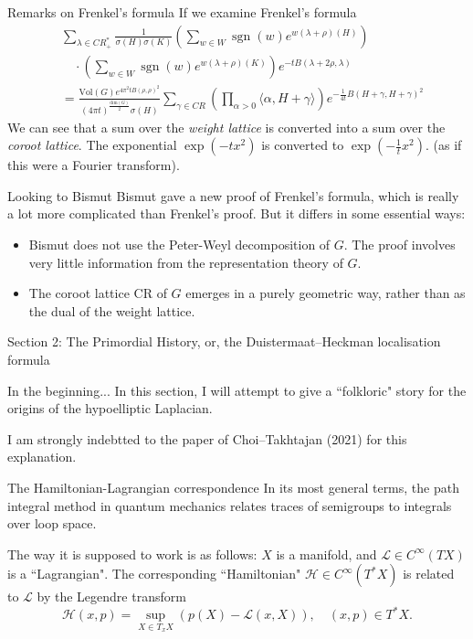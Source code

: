 \documentclass{beamer}
\numberwithin{equation}{section}
\theoremstyle{plain}
\theoremstyle{plain}
\theoremstyle{definition}
\theoremstyle{plain}
\theoremstyle{plain}
\theoremstyle{definition}
\newcommand{\Hc}{\mathcal{H}}
\newcommand{\Lc}{\mathcal{L}}
\newcommand{\sgn}{\operatorname{sgn}}
\newcommand{\CR}{\mathrm{CR}}
\begin{document}
\begin{frame}{Remarks on Frenkel's formula}
If we examine Frenkel's formula
\begin{align*}
 &\sum_{\lambda \in CR^*_+} \frac{1}{\sigma(H)\sigma(K)}\left(\sum_{w \in W} \sgn(w)e^{w(\lambda+\rho)(H)}\right)\\
      &\quad \cdot \left(\sum_{w\in W} \sgn(w)e^{w(\lambda+\rho)(K)}\right)e^{-tB(\lambda+2\rho,\lambda)}\\
      &=\frac{\mathrm{Vol}(G)e^{4\pi^2tB(\rho,\rho)^2}}{(4\pi t)^{\frac{\mathrm{dim}(G)}{2}}\sigma(H)}\sum_{\gamma \in CR} \left(\prod_{\alpha>0} \langle \alpha,H+\gamma\rangle\right) e^{-\frac{1}{4t}B(H+\gamma,H+\gamma)^2}
\end{align*}
We can see that a sum over the \emph{weight lattice} is converted into a sum over the \emph{coroot lattice}. The exponential $\exp(-tx^2)$ is converted to $\exp(-\frac{1}{t}x^2).$ (as if this were a Fourier transform).
\end{frame}

\begin{frame}{Looking to Bismut}
Bismut gave a new proof of Frenkel's formula, which is really a lot more complicated than Frenkel's proof. But it differs in some essential ways:
\begin{itemize}
  \item{} Bismut does not use the Peter-Weyl decomposition of $G.$ The proof involves very little information from the representation theory of $G.$
  \item{} The coroot lattice $\CR$ of $G$ emerges in a purely geometric way, rather than as the dual of the weight lattice.
\end{itemize}
\end{frame}

\begin{frame}
    \huge{Section 2: The Primordial History, or, the Duistermaat--Heckman localisation formula}
\end{frame}

\begin{frame}{In the beginning...}
  In this section, I will attempt to give a ``folkloric" story for the origins of the hypoelliptic Laplacian.
  
  I am strongly indebtted to the paper of Choi--Takhtajan (2021) for this explanation.
\end{frame}

\begin{frame}{The Hamiltonian-Lagrangian correspondence}
  In its most general terms, the path integral method in quantum mechanics relates traces of semigroups
  to integrals over loop space. 
  
  The way it is supposed to work is as follows: $X$ is a manifold, and $\Lc \in C^\infty(TX)$ is a ``Lagrangian". The corresponding
  ``Hamiltonian" $\Hc\in C^\infty(T^*X)$ is related to $\Lc$ by the Legendre transform 
  \[
    \Hc(x,p) = \sup_{X \in T_xX} (p(X)-\Lc(x,X)),\quad (x,p) \in T^*X.
  \]
\end{frame}
\end{document}
